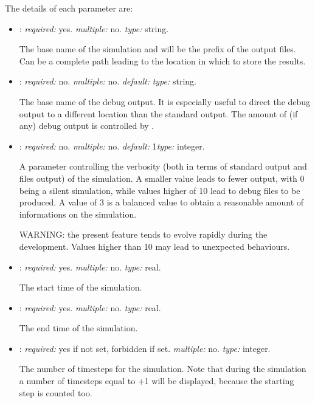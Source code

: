 The details of each parameter are:
\begin{itemize}
\item {}: \textit{required:} yes. \textit{multiple:} no. \textit{type:} string.

The base name of the simulation and will be the prefix of the output files. Can be a complete path leading to the location in which to store the results. 

\item {}: \textit{required:} no. \textit{multiple:} no. \textit{default:}  \textit{type:} string.

The base name of the debug output. It is especially useful to direct the debug output to a different location than the standard output. The amount of (if any) debug output is controlled by .

\item {}: \textit{required:} no. \textit{multiple:} no. \textit{default:} 1\textit{type:} integer.

A parameter controlling the verbosity (both in terms of standard output and files output) of the simulation. A smaller value leads to fewer output, with 0 being a silent simulation, while values higher of 10 lead to debug files to be produced. A value of 3 is a balanced value to obtain a reasonable amount of informations on the simulation. 

WARNING: the present feature tends to evolve rapidly during the development. Values higher than 10 may lead to unexpected behaviours. 


\item {}: \textit{required:} yes. \textit{multiple:} no. \textit{type:} real.

The start time of the simulation.

\item {}: \textit{required:} yes. \textit{multiple:} no. \textit{type:} real.

The end time of the simulation.

\item {}: \textit{required:} yes if  not set, forbidden if set. \textit{multiple:} no. \textit{type:} integer.

The number of timesteps for the simulation. Note that during the simulation a number of timesteps equal to +1 will be displayed, because the starting step is counted too. 


\end{itemize}
